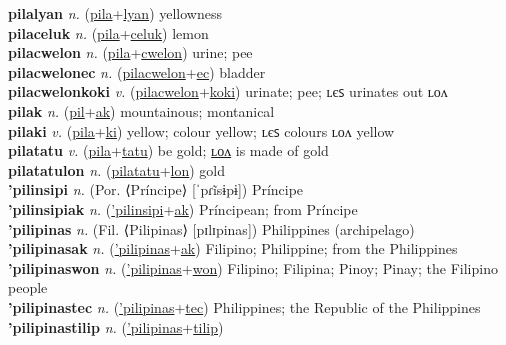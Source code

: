\textbf{pilalyan} \textit{n.} (\hyperref[pila]{pila}+\hyperref[lyan]{lyan})
yellowness \label{pilalyan} \\
\textbf{pilaceluk} \textit{n.} (\hyperref[pila]{pila}+\hyperref[celuk]{celuk})
lemon \label{pilaceluk} \\
\textbf{pilacwelon} \textit{n.} (\hyperref[pila]{pila}+\hyperref[cwelon]{cwelon})
urine; pee \label{pilacwelon} \\
\textbf{pilacwelonec} \textit{n.} (\hyperref[pilacwelon]{pilacwelon}+\hyperref[ec]{ec})
bladder \label{pilacwelonec} \\
\textbf{pilacwelonkoki} \textit{v.} (\hyperref[pilacwelon]{pilacwelon}+\hyperref[koki]{koki})
urinate; pee; ʟєꜱ urinates out ʟᴏᴧ \label{pilacwelonkoki} \\
\textbf{pilak} \textit{n.} (\hyperref[pil]{pil}+\hyperref[ak]{ak})
mountainous; montanical \label{pilak} \\
\textbf{pilaki} \textit{v.} (\hyperref[pila]{pila}+\hyperref[ki]{ki})
yellow; colour yellow; ʟєꜱ colours ʟᴏᴧ yellow \label{pilaki} \\
\textbf{pilatatu} \textit{v.} (\hyperref[pila]{pila}+\hyperref[tatu]{tatu})
be gold; \hyperref[pilatatulon]{ʟᴏᴧ} is made of gold \label{pilatatu} \\
\textbf{pilatatulon} \textit{n.} (\hyperref[pilatatu]{pilatatu}+\hyperref[lon]{lon})
gold \label{pilatatulon} \\
\textbf{'pilinsipi} \textit{n.} (Por. ⟨Príncipe⟩ [ˈpɾĩsɨpɨ])
Príncipe \label{'pilinsipi} \\
\textbf{'pilinsipiak} \textit{n.} (\hyperref['pilinsipi]{'pilinsipi}+\hyperref[ak]{ak})
Príncipean; from Príncipe \label{'pilinsipiak} \\
\textbf{'pilipinas} \textit{n.} (Fil. ⟨Pilipinas⟩ [pɪlɪpinas])
Philippines (archipelago) \label{'pilipinas} \\
\textbf{'pilipinasak} \textit{n.} (\hyperref['pilipinas]{'pilipinas}+\hyperref[ak]{ak})
Filipino; Philippine; from the Philippines \label{'pilipinasak} \\
\textbf{'pilipinaswon} \textit{n.} (\hyperref['pilipinas]{'pilipinas}+\hyperref[won]{won})
Filipino; Filipina; Pinoy; Pinay; the Filipino people \label{'pilipinaswon} \\
\textbf{'pilipinastec} \textit{n.} (\hyperref['pilipinas]{'pilipinas}+\hyperref[tec]{tec})
Philippines; the Republic of the Philippines \label{'pilipinastec} \\
\textbf{'pilipinastilip} \textit{n.} (\hyperref['pilipinas]{'pilipinas}+\hyperref[tilip]{tilip})
